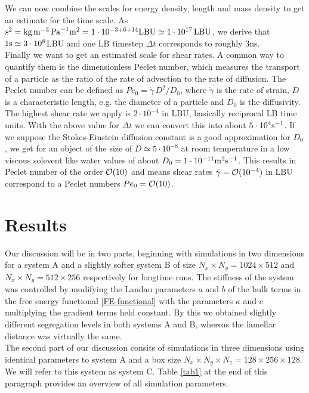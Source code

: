 \documentclass[8.5pt,twoside,twocolumn]{article}
\newcommand{\e}[1]{\cdot10^{#1}}
\newcommand{\gd}{\dot{\gamma}}
\begin{document}
We can now combine the scales for energy density, length and mass density to get an estimate for the time scale.
As ${\rm s}^2=\rm{kg}\, \rm{m}^{-3}\, \rm{Pa}^{-1}\rm{m}^2=1\e{-3+6+14} \rm{LBU}\simeq1\e{17} \,{\rm LBU}$, we derive that $1 \rm{s}\simeq3\e{8}$LBU and one LB timestep $\Delta t$ corresponds to roughly 3ns.\\
Finally we want to get an estimated scale for shear rates. 
A common way to quantify them is the dimensionless Peclet number, which measures the transport of a particle as the ratio of the rate of advection to the rate of diffusion.
The Peclet number can be defined as $Pe_0=\gd\, D^2/D_0$, where $\gd$ is the rate of strain, $D$ is a characteristic length, e.g. the diameter of a particle and $D_0$ is the diffusivity.
The highest shear rate we apply is $2\e{-4}$ in LBU, basically reciprocal LB time units.
With the above value for $\Delta t$ we can convert this into about $5\e{4}{\rm s}^{-1}$.
If we suppose the Stokes-Einstein diffusion constant is a good approximation for $D_0$, we get for an object of the size of $D\simeq5\e{-8}$ at room temperature in a low viscous solevent like water values of about $D_0=1\e{-11} \rm{m}^2\rm{s}^{-1}$.
This results in Peclet number of the order ${\cal O}(10)$ and means shear rates $\gd={\cal O}(10^{-4})$ in LBU correspond to a Peclet numbers $Pe_0={\cal O}(10)$.

\section{Results}

Our discussion will be in two parts, beginning with simulations in two dimensions for a system A and a slightly softer system B of size $N_x\times N_y=1024\times 512$ and $N_x \times N_y=512\times 256$ respectively for longtime runs.
The stiffness of the system was controlled by modifying the Landau parameters $a$ and $b$ of the bulk terms in the free energy functional \ref{FE-functional} with the parameters $\kappa$ and $c$ multiplying the gradient terms held constant.
By this we obtained slightly different segregation levels in both systems A and B, whereas the lamellar distance was virtually the same.\\
The second part of our discussion consits of simulations in three dimensions using identical parameters to system A and a box size $N_x\times N_y\times N_z=128\times256\times128$.
We will refer to this system as system C.
Table \ref{tab1} at the end of this paragraph provides an overview of all simulation parameters.
\end{document}

